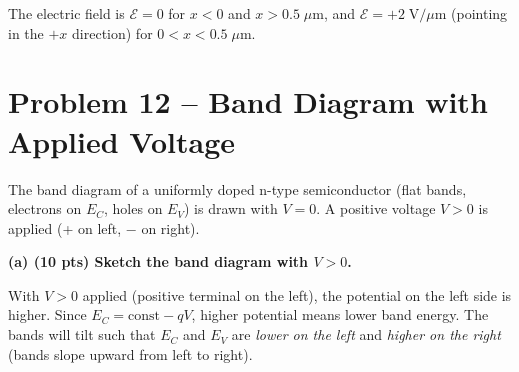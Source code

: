 \documentclass[11pt]{article}
\begin{document}
\begin{answerbox}
  \begin{center}
  \end{center}

  The electric field is $\mathcal{E} = 0$ for $x < 0$ and $x > 0.5\;\mu$m, and $\mathcal{E} = +2\;\text{V}/\mu\text{m}$ (pointing in the $+x$ direction) for $0 < x < 0.5\;\mu$m.
\end{answerbox}

\newpage

\section*{Problem 12 -- Band Diagram with Applied Voltage}

The band diagram of a uniformly doped n-type semiconductor (flat bands, electrons on $E_C$, holes on $E_V$) is drawn with $V = 0$. A positive voltage $V > 0$ is applied (+ on left, $-$ on right).

\textbf{(a) (10 pts) Sketch the band diagram with $V > 0$.}

With $V > 0$ applied (positive terminal on the left), the potential on the left side is higher. Since $E_C = \text{const} - qV$, higher potential means lower band energy. The bands will tilt such that $E_C$ and $E_V$ are \emph{lower on the left} and \emph{higher on the right} (bands slope upward from left to right).
\end{document}
